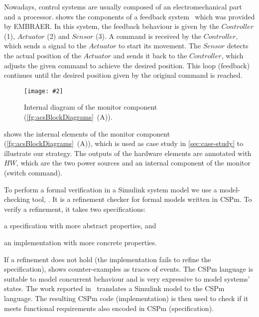\documentclass[12pt,openright,twoside,a4paper,oldfontcommands,english,brazil,draft]{abntex2}
\theoremstyle{theo}
\newcommand{\includegraphicsaspectratio}[2][1]{%
  \texttt{[image: \#2]}%
}
\newcommand{\EMBRAER}{EMBRAER\xspace}
\newcommand{\textsim}[1]{$#1$}
\newcommand{\simulink}{Simulink\xspace}
\begin{document}
Nowadays, control systems are usually composed of an electromechanical part and a processor.
 shows the components of a feedback system~\cite{AM2008} which was provided by \EMBRAER.
In this system, the feedback behaviour is given by the \textsim{Controller} (1), \textsim{Actuator} (2) and \textsim{Sensor} (3). A command is received by the \textsim{Controller}, which sends a signal to the \textsim{Actuator} to start its movement.
The \textsim{Sensor} detects the actual position of the \textsim{Actuator} and sends it back to the \textsim{Controller}, which adjusts the given command to achieve the desired position. This loop (feedback) continues until the desired position given by the original command is reached.

\begin{figure}[t] \centering
\includegraphicsaspectratio[0.6]{blockDiagramMonitorInternals}
  \caption{Internal diagram of the monitor component (\cref{fg:acsBlockDiagrams}~(A)).}
  \label{fg:blockDiagramMonitorInternals}
\end{figure}

 shows the internal elements of the monitor component (\cref{fg:acsBlockDiagrams}~(A)), which is used as case study in \cref{sec:case-study} to illustrate our
strategy.
The outputs of the hardware elements are annotated with \textsim{HW}, which are the two power sources and an internal component of the monitor (switch command).


To perform a formal verification in a \simulink system model we use a model-checking tool, .
It is a refinement checker for formal models written in \ac{CSPm}.
To verify a refinement, it takes two specifications:
\begin{alineasinline}
  \item a specification with more abstract properties, and
  \item an implementation with more concrete properties.
\end{alineasinline}
If a refinement does not hold (the implementation fails to refine the specification),  shows counter-examples as traces of events.
The \ac{CSPm} language is suitable to model concurrent behaviour and is very expressive to model systems' states.
The work reported in~\cite{JMS+2011} translates a \simulink model to the \ac{CSPm} language.
%
The resulting \ac{CSPm} code (implementation) is then used to check if it meets functional requirements also encoded in \ac{CSPm} (specification).
\end{document}
